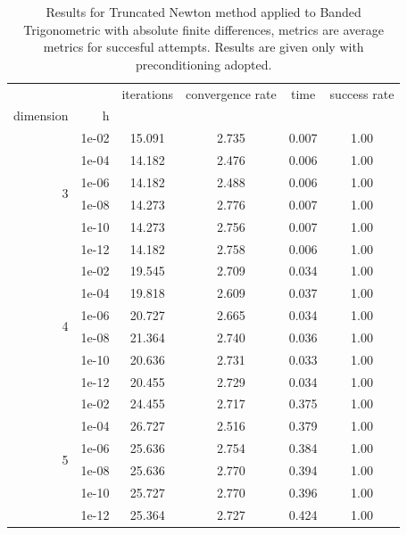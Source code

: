 \begin{table}
\centering
\caption{Results for Truncated Newton method applied to Banded Trigonometric with absolute finite differences, metrics are average metrics for succesful attempts. Results are given only with preconditioning adopted.}
\label{tab:Truncated_Newton_Banded_Trigonometric_fd_abs}
\begin{tabular}{rr|cccc}
\toprule
    &  & iterations & convergence rate & time & success rate \\
dimension & h &  &  &  &  \\
\midrule
\multirow[t]{6}{*}{3} & 1e-02 & 15.091 & 2.735 & 0.007 & 1.00 \\
    & 1e-04 & 14.182 & 2.476 & 0.006 & 1.00 \\
    & 1e-06 & 14.182 & 2.488 & 0.006 & 1.00 \\
    & 1e-08 & 14.273 & 2.776 & 0.007 & 1.00 \\
    & 1e-10 & 14.273 & 2.756 & 0.007 & 1.00 \\
    & 1e-12 & 14.182 & 2.758 & 0.006 & 1.00 \\
\cline{1-6}
\multirow[t]{6}{*}{4} & 1e-02 & 19.545 & 2.709 & 0.034 & 1.00 \\
    & 1e-04 & 19.818 & 2.609 & 0.037 & 1.00 \\
    & 1e-06 & 20.727 & 2.665 & 0.034 & 1.00 \\
    & 1e-08 & 21.364 & 2.740 & 0.036 & 1.00 \\
    & 1e-10 & 20.636 & 2.731 & 0.033 & 1.00 \\
    & 1e-12 & 20.455 & 2.729 & 0.034 & 1.00 \\
\cline{1-6}
\multirow[t]{6}{*}{5} & 1e-02 & 24.455 & 2.717 & 0.375 & 1.00 \\
    & 1e-04 & 26.727 & 2.516 & 0.379 & 1.00 \\
    & 1e-06 & 25.636 & 2.754 & 0.384 & 1.00 \\
    & 1e-08 & 25.636 & 2.770 & 0.394 & 1.00 \\
    & 1e-10 & 25.727 & 2.770 & 0.396 & 1.00 \\
    & 1e-12 & 25.364 & 2.727 & 0.424 & 1.00 \\
\cline{1-6}
\bottomrule
\end{tabular}
\end{table}

